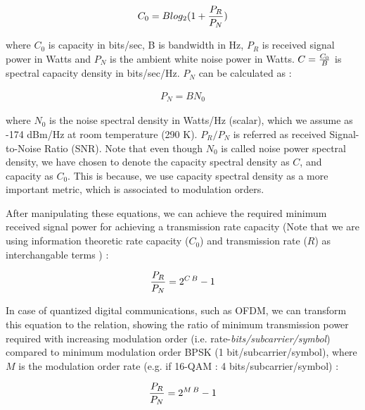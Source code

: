 \begin{align}
C_{0} =  Blog_{2}(1 + {P_{R} \over P_{N}}) 
\end{align}

where $C_{0}$ is capacity in bits/sec, B is bandwidth in Hz, $P_{R}$ is received signal power in Watts and $P_{N}$ is the ambient white noise power in Watts. $C = {C_{0} \over B} $ is spectral capacity density in bits/sec/Hz. $P_{N}$ can be calculated as : 

\begin{align}
P_{N} =  BN_{0}
\end{align}

where $N_{0}$ is the noise spectral density in Watts/Hz (scalar), which we assume as -174 dBm/Hz at room temperature (290 K). $P_{R}/P_{N}$ is referred as received Signal-to-Noise Ratio (SNR). Note that even though $N_{0}$ is called noise power spectral density, we have chosen to denote the capacity spectral density as $C$, and capacity as $C_{0}$. This is because, we use capacity spectral density as a more important metric, which is associated to modulation orders. 

After manipulating these equations, we can achieve the required minimum received signal power for achieving a transmission rate capacity (Note that we are using information theoretic rate capacity ($C_{0}$) and transmission rate ($R$) as interchangable terms ) :

\begin{align}
{P_{R} \over P_{N}} = {2}^{C \, B}-1
\end{align}

In case of quantized digital communications, such as OFDM, we can transform this equation to the relation, showing the ratio of minimum transmission power required with increasing modulation order (i.e. rate-\textit{bits/subcarrier/symbol}) compared to minimum modulation order BPSK (1 bit/subcarrier/symbol), where $M$ is the modulation order rate (e.g. if 16-QAM : 4 bits/subcarrier/symbol) :

\begin{align}
{P_{R} \over P_{N}} = {2}^{M \, B}-1
\end{align}	


